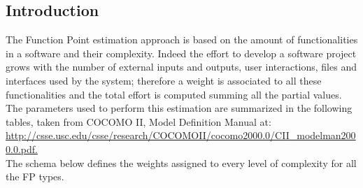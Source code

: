 \documentclass[a4paper,11pt]{report} %
\begin{document}
		\subsection{Introduction}
			The Function Point estimation approach is based on the amount of functionalities in a software and their complexity. Indeed the effort to develop a software project grows with the number of external inputs and outputs, user interactions, files and interfaces used by the system; therefore a weight is associated to all these functionalities and the total effort is computed summing all the partial values.\bigskip \\
			The parameters used to perform this estimation are summarized in the following tables, taken from COCOMO II, Model Definition Manual at:\smallskip\\ \href{http://csse.usc.edu/csse/research/COCOMOII/cocomo2000.0/CII\_modelman2000.0.pdf}{http://csse.usc.edu/csse/research/COCOMOII/cocomo2000.0/CII\_modelman2000.0.pdf.}\bigskip\\
			The schema below defines the weights assigned to every level of complexity for all the FP types.\smallskip\\
			\begin{minipage}{\linewidth}
			\end{minipage}
\end{document}
